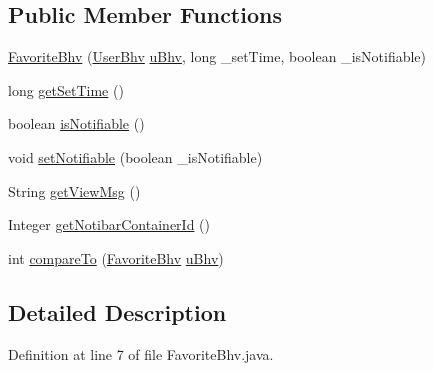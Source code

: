 \subsection*{\-Public \-Member \-Functions}
\begin{DoxyCompactItemize}
\item 
\hyperlink{classlab_1_1davidahn_1_1appshuttle_1_1view_1_1_favorite_bhv_a4cbec18a58f365d7fce4056c37722892}{\-Favorite\-Bhv} (\hyperlink{interfacelab_1_1davidahn_1_1appshuttle_1_1collect_1_1bhv_1_1_user_bhv}{\-User\-Bhv} \hyperlink{classlab_1_1davidahn_1_1appshuttle_1_1view_1_1_viewable_user_bhv_a562684126a3e756e8ebe246c89699ba9}{u\-Bhv}, long \-\_\-set\-Time, boolean \-\_\-is\-Notifiable)
\item 
long \hyperlink{classlab_1_1davidahn_1_1appshuttle_1_1view_1_1_favorite_bhv_a7842f627ef6b3794d12c8c64f97161d7}{get\-Set\-Time} ()
\item 
boolean \hyperlink{classlab_1_1davidahn_1_1appshuttle_1_1view_1_1_favorite_bhv_a7023e6858239f8bbdef260d8e22e9d6c}{is\-Notifiable} ()
\item 
void \hyperlink{classlab_1_1davidahn_1_1appshuttle_1_1view_1_1_favorite_bhv_a519adb4bd072ef46e5011832b70314fa}{set\-Notifiable} (boolean \-\_\-is\-Notifiable)
\item 
\-String \hyperlink{classlab_1_1davidahn_1_1appshuttle_1_1view_1_1_favorite_bhv_aad9001b054111e83499417c57c0ce773}{get\-View\-Msg} ()
\item 
\-Integer \hyperlink{classlab_1_1davidahn_1_1appshuttle_1_1view_1_1_favorite_bhv_a4414ababfafbfa91ec1f563e796f9e0b}{get\-Notibar\-Container\-Id} ()
\item 
int \hyperlink{classlab_1_1davidahn_1_1appshuttle_1_1view_1_1_favorite_bhv_a908d58afdab9047a86a6ae564470aa35}{compare\-To} (\hyperlink{classlab_1_1davidahn_1_1appshuttle_1_1view_1_1_favorite_bhv}{\-Favorite\-Bhv} \hyperlink{classlab_1_1davidahn_1_1appshuttle_1_1view_1_1_viewable_user_bhv_a562684126a3e756e8ebe246c89699ba9}{u\-Bhv})
\end{DoxyCompactItemize}


\subsection{\-Detailed \-Description}


\-Definition at line 7 of file \-Favorite\-Bhv.\-java.



